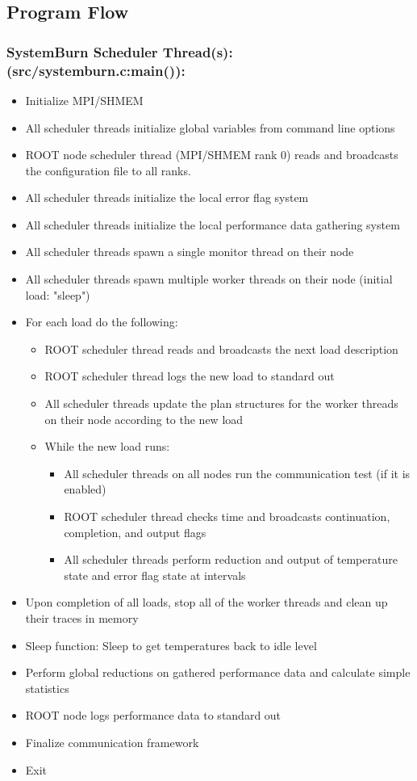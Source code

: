 \subsection{Program Flow}

\subsubsection{SystemBurn Scheduler Thread(s): (src/systemburn.c:main()):}

\begin{itemize}
	\item Initialize MPI/SHMEM
	\item All scheduler threads initialize global variables from command line options
	\item ROOT node scheduler thread (MPI/SHMEM rank 0) reads and broadcasts the configuration file to all ranks.
	\item All scheduler threads initialize the local error flag system
	\item All scheduler threads initialize the local performance data gathering system
	\item All scheduler threads spawn a single monitor thread on their node
	\item All scheduler threads spawn multiple worker threads on their node (initial load: "sleep")
	\item For each load do the following:
	\begin{itemize}
		\item ROOT scheduler thread reads and broadcasts the next load description
		\item ROOT scheduler thread logs the new load to standard out
		\item All scheduler threads update the plan structures for the worker threads on their node according to the new load
		\item While the new load runs:
		\begin{itemize}
			\item All scheduler threads on all nodes run the communication test (if it is enabled)
			\item ROOT scheduler thread checks time and broadcasts continuation, completion, and output flags
			\item All scheduler threads perform reduction and output of temperature state and error flag state at intervals
		\end{itemize}
	\end{itemize}
	\item Upon completion of all loads, stop all of the worker threads and clean up their traces in memory
	\item Sleep function: Sleep to get temperatures back to idle level
	\item Perform global reductions on gathered performance data and calculate simple statistics
	\item ROOT node logs performance data to standard out
	\item Finalize communication framework
	\item Exit 
\end{itemize} 

